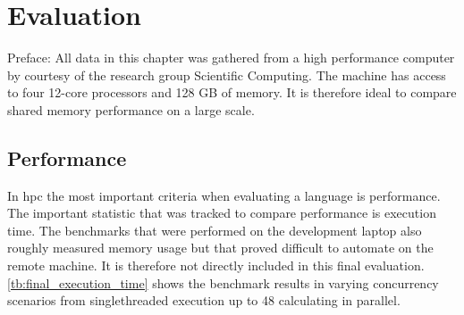 \chapter{Evaluation}
\label{ch:Evaluation}


Preface: All data in this chapter was gathered from a high performance computer by courtesy of the research group Scientific Computing. The machine has access to four 12-core processors and 128 GB of memory. It is therefore ideal to compare shared memory performance on a large scale.

\section{Performance}
\label{sec:Evaluaton::Performance}

In \acrlong{hpc} the most important criteria when evaluating a language is performance. The important statistic that was tracked to compare performance is execution time. The benchmarks that were performed on the development laptop also roughly measured memory usage but that proved difficult to automate on the remote machine. It is therefore not directly included in this final evaluation. \autoref{tb:final_execution_time} shows the benchmark results in varying concurrency scenarios from singlethreaded execution up to 48 calculating in parallel.

